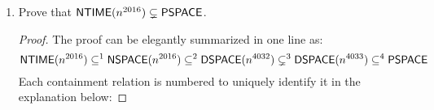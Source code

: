 \documentclass[usletter]{article}
\newcommand {\langset}[1]      {\ensuremath{\mathcal{#1}}}
\newcommand {\machine}[1]      {\ensuremath{\mathscr{#1}}}
\newcommand {\langfunc}        {\ensuremath{\mathfrak{L}}}
\newcommand {\namedlangset}[1] {\ensuremath{\textnormal{\textsc{#1}}}}
\newcommand {\family}[1]       {\ensuremath{\textnormal{\textsf{#1}}}}
\newcommand {\indpar}[1]   {
  \par\leftskip=#1em
  \noindent\ignorespaces
}
\newenvironment{turing}[2] {
  \smallskip
  \indpar{2}
  \textbf{Machine:} #1\\
  \textbf{Input:} $#2$\\[5pt]
  \textbf{begin}
  \parskip=0pt
  \indpar{3}
}{
  \indpar{2}
  \textbf{end}
  \par\medskip
}
\newcommand {\langL}          {\langset{L}}
\newcommand {\machineM}       {\machine{M}}
\begin{document}
\begin{enumerate}
\begin{proof}
\begin{proof}
      Then following TM equipped with oracle \namedlangset{TQBF} would be able
      to decide \langL:
      \begin{turing}{$\machineM_\langL^\namedlangset{TQBF}$}{x}
        apply the polynomial time transformation
          $p_\langL^\namedlangset{TQBF}(x)$ resulting in $y$ \\
        \texttt{query} oracle \namedlangset{TQBF} for $y$ \\
        return the result from the oracle
      \end{turing}
      Clearly,
      $\forall \langL \in \family{PSPACE} :
        \langL = \langfunc(\machineM_\langL^\namedlangset{TQBF})
        \wedge \langfunc(\machineM_\langL^\namedlangset{TQBF})
          \in \family{P}^\namedlangset{TQBF}$.

      Thus, $\family{PSPACE} \subseteq \family{P}^\namedlangset{TQBF}$.
    \end{proof}

    \begin{claim}
      $ \family{NP}^\namedlangset{TQBF} \subseteq \family{NPSPACE} $.
    \end{claim}
    \begin{proof}
      By definition a TM in \family{NP}, uses at most polynomial amount of space
      and thus $\family{NP} \subseteq \family{NPSPACE}$. \\
      We also know that $\namedlangset{TQBF} \in \family{PSPACE}$. So we can
      encode the TM for \namedlangset{TQBF} into our non-deterministic TM,
      instead of using it as an oracle, and we would still use polynomial amount
      of space (if we re-use the same cells for computations every time we
      invoke this TM). \\
      Thus, instead of relativizing if we simply embed the TM for \family{TQBF},
      we have a non-deterministic TM with the same language which still in
      polynomial space.
    \end{proof}

    Therefore, we have
    $\family{PSPACE} \subseteq \family{P}^\namedlangset{TQBF}
                     \subseteq \family{NP}^\namedlangset{TQBF}
                     \subseteq \family{NPSPACE}
                     \subseteq \family{PSPACE}$
    (the last containment is due to Savitch's Theorem);
    from which it follows immediately that
    $\family{P}^\namedlangset{TQBF} = \family{NP}^\namedlangset{TQBF}$.
  \end{proof}

  \item Prove that $\family{NTIME}(n^{2016}) \subsetneq \family{PSPACE}$.
  \begin{proof}
    The proof can be elegantly summarized in one line as:
    $$
      \family{NTIME}(n^{2016}) \subseteq^1 \family{NSPACE}(n^{2016})
                               \subseteq^2 \family{DSPACE}(n^{4032})
                               \subsetneq^3 \family{DSPACE}(n^{4033})
                               \subseteq^4 \family{PSPACE}
    $$
    Each containment relation is numbered to uniquely identify it in the
    explanation below:


\end{proof}
\end{enumerate}
\end{document}
